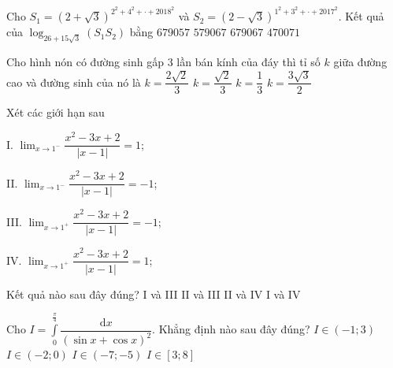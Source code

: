\begin{ex}%
Cho $S_1=\left ( 2+\sqrt{3}\right )^{2^2+4^2+ \cdot + 2018^2}$ và $S_2=\left ( 2-\sqrt{3}\right )^{1^2+3^2+ \cdot + 2017^2}$. Kết quả của $\log_{26+15\sqrt{3}} \left (S_1S_2\right )$ bằng
\choice
{\True $679057$}
{$579067$}
{$679067$}
{$470071$}
\end{ex}


\begin{ex}%
Cho  hình nón có đường sinh gấp $3$ lần bán kính của đáy thì tỉ số $k$ giữa đường cao và đường sinh của nó là 
\choice
{\True $k=\dfrac{2\sqrt{2}}{3}$}
{$k=\dfrac{\sqrt{2}}{3}$}
{$k=\dfrac{1}{3}$}
{$k=\dfrac{3\sqrt{3}}{2}$}
\end{ex}


\begin{ex}%
Xét các giới hạn sau 
\begin{multicols}{2}
\item I. $\displaystyle \lim_{x \to 1^-} \dfrac{x^2-3x+2}{|x-1|}=1$; 
\item II. $\displaystyle \lim_{x \to 1^-} \dfrac{x^2-3x+2}{|x-1|}=-1$; 
\item III. $\displaystyle \lim_{x \to 1^+} \dfrac{x^2-3x+2}{|x-1|}=-1$; 
\item IV. $\displaystyle \lim_{x \to 1^+} \dfrac{x^2-3x+2}{|x-1|}=1$; 
\end{multicols}
\noindent
Kết quả nào sau đây đúng?
\choice
{\True I và III}
{II và III}
{II và IV}
{I và IV}
\end{ex}


\begin{ex}%
Cho $\displaystyle I=\int\limits_{0}^{\frac{\pi}{4}} \dfrac{\mathrm{d}x}{\left (\sin x +\cos x\right )^2}$. Khẳng định nào sau đây đúng?
\choice
{\True $I \in (-1;3)$}
{$I \in (-2;0)$}
{$I \in (-7;-5)$}
{$I \in [3;8]$}
\end{ex}


